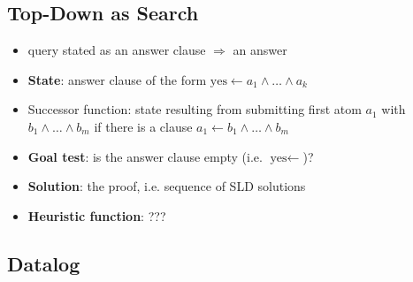\documentclass{article}
\begin{document}
\subsection{Top-Down as Search}

\begin{itemize}
    \item query stated as an answer clause $\Rightarrow$ an answer
    \item \textbf{State}: answer clause of the form $\text{yes} \leftarrow a_1 \wedge \ldots \wedge a_k$
    \item Successor function: state resulting from submitting first atom $a_1$ with $b_1 \wedge \ldots \wedge b_m$ if there is a clause $a_1 \leftarrow b_1 \wedge \ldots \wedge b_m$
    \item \textbf{Goal test}: is the answer clause empty (i.e. $\text{yes} \leftarrow$)?
    \item \textbf{Solution}: the proof, i.e. sequence of SLD solutions
    \item \textbf{Heuristic function}: ???
\end{itemize}

\subsection{Datalog}
\end{document}
